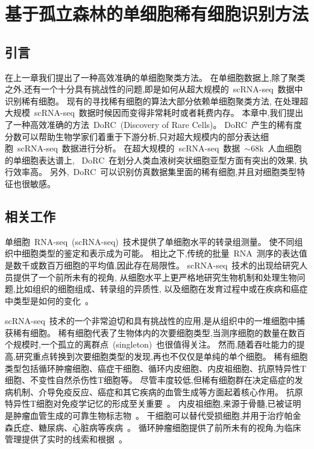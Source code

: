 \section{基于孤立森林的单细胞稀有细胞识别方法}
\label{sec:dorc}

\subsection{引言}
在上一章我们提出了一种高效准确的单细胞聚类方法。
在单细胞数据上,除了聚类之外,还有一个十分具有挑战性的问题,即是如何从超大规模的~scRNA-seq~数据中识别稀有细胞。
现有的寻找稀有细胞的算法大部分依赖单细胞聚类方法,
在处理超大规模~scRNA-seq~数据时候因而变得非常耗时或者耗费内存。
本章中,我们提出了一种高效准确的方法~DoRC~(Discovery of Rare Cells)。
DoRC~产生的稀有度分数可以帮助生物学家们着重于下游分析,只对超大规模内的部分表达细胞~scRNA-seq~数据进行分析。
在超大规模的~scRNA-seq~数据~${\sim}68$k~人血细胞的单细胞表达谱上,
~DoRC~在划分人类血液树突状细胞亚型方面有突出的效果, 执行效率高。
另外,~DoRC~可以识别仿真数据集里面的稀有细胞,并且对细胞类型特征也很敏感。

\subsection{相关工作}
单细胞~RNA-seq~(scRNA-seq)~技术提供了单细胞水平的转录组测量。
使不同组织中细胞类型的鉴定和表示成为可能。
相比之下,传统的批量~RNA~测序的表达值是数千或数百万细胞的平均值,因此存在局限性。
scRNA-seq~技术的出现给研究人员提供了一个前所未有的视角,
从细胞水平上更严格地研究生物机制和处理生物问题,比如组织的细胞组成、转录组的异质性,
以及细胞在发育过程中或在疾病和癌症中类型是如何的变化~\cite{kumar2017understanding,patel2014single}。

scRNA-seq~技术的一个非常迫切和具有挑战性的应用,是从组织中的一堆细胞中捕获稀有细胞。
稀有细胞代表了生物体内的次要细胞类型,当测序细胞的数量在数百个规模时,一个孤立的离群点~(singleton)~也很值得关注。
然而,随着吞吐能力的提高,研究重点转换到次要细胞类型的发现,再也不仅仅是单纯的单个细胞。
稀有细胞类型包括循环肿瘤细胞、癌症干细胞、循环内皮细胞、内皮祖细胞、抗原特异性T细胞、不变性自然杀伤性T细胞等。
尽管丰度较低,但稀有细胞群在决定癌症的发病机制、介导免疫反应、癌症和其它疾病的血管生成等方面起着核心作用。
抗原特异性T细胞对免疫学记忆的形成至关重要~\cite{slansky2003antigen,altman1996phenotypic,manzo2015antigen}。
内皮祖细胞,来源于骨髓,已被证明是肿瘤血管生成的可靠生物标志物~\cite{kuo2012dynamics,cima2016tumor}。
干细胞可以替代受损细胞,并用于治疗帕金森氏症、糖尿病、心脏病等疾病~\cite{jang2005stem}。
循环肿瘤细胞提供了前所未有的视角,为临床管理提供了实时的线索和根据~\cite{krebs2010circulating}。

